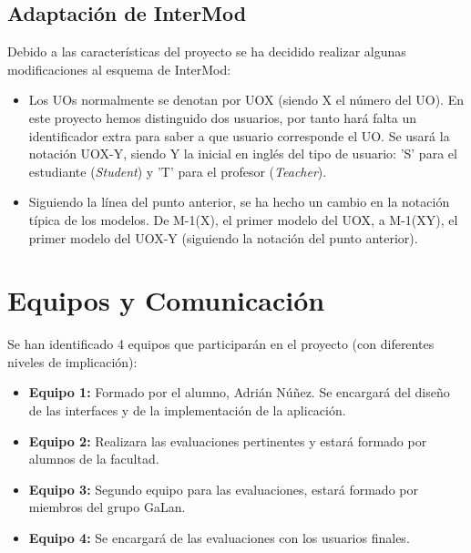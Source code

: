\subsection{Adaptación de InterMod}
\label{adaptacion-intermod}

Debido a las características del proyecto se ha decidido realizar algunas modificaciones al esquema de InterMod:

\begin{itemize}
\item Los UOs normalmente se denotan por UOX (siendo X el número del UO). En este proyecto hemos distinguido dos usuarios, por tanto hará falta un identificador extra para saber a que usuario corresponde el UO. Se usará la notación UOX-Y, siendo Y la inicial en inglés del tipo de usuario: 'S' para el estudiante (\textit{Student}) y 'T' para el profesor (\textit{Teacher}).
\item Siguiendo la línea del punto anterior, se ha hecho un cambio en la notación típica de los modelos. De M-1(X), el primer modelo del UOX, a M-1(XY), el primer modelo del UOX-Y (siguiendo la notación del punto anterior).
\end{itemize}

\section{Equipos y Comunicación}
\label{equipos}

Se han identificado 4 equipos que participarán en el proyecto (con diferentes niveles de implicación):

\begin{itemize}
\item \textbf{Equipo 1:} Formado por el alumno, Adrián Núñez. Se encargará del diseño de las interfaces y de la implementación de la aplicación.
\item \textbf{Equipo 2:} Realizara las evaluaciones pertinentes y estará formado por alumnos de la facultad.
\item \textbf{Equipo 3:} Segundo equipo para las evaluaciones, estará formado por miembros del grupo GaLan.
\item \textbf{Equipo 4:} Se encargará de las evaluaciones con los usuarios finales.
\end{itemize}


